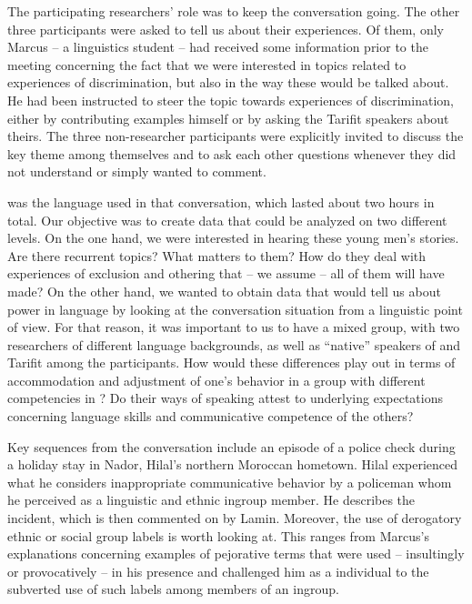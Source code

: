 \documentclass[output=paper,colorlinks,citecolor=brown]{langscibook}
\begin{document}
The participating researchers' role was to keep the conversation going. The other three participants were asked to tell us about their experiences. Of them, only Marcus -- a linguistics student -- had received some information prior to the meeting concerning the fact that we were interested in topics related to experiences of discrimination, but also in the way these would be talked about. He had been instructed to steer the topic towards experiences of discrimination, either by contributing examples himself or by asking the Tarifit speakers about theirs. The three non-researcher participants were explicitly invited to discuss the key theme among themselves and to ask each other questions whenever they did not understand or simply wanted to comment.

 was the language used in that conversation, which lasted about two hours in total. Our objective was to create data that could be analyzed on two different levels. On the one hand, we were interested in hearing these young men's stories. Are there recurrent topics? What matters to them? How do they deal with experiences of exclusion and othering that -- we assume -- all of them will have made? On the other hand, we wanted to obtain data that would tell us about power in language by looking at the conversation situation from a linguistic point of view. For that reason, it was important to us to have a mixed group, with two researchers of different language backgrounds, as well as ``native'' speakers of  and Tarifit among the participants. How would these differences play out in terms of accommodation and adjustment of one's behavior in a group with different competencies in ? Do their ways of speaking attest to underlying expectations concerning language skills and communicative competence of the others? 

Key sequences from the conversation include an episode of a police check during a holiday stay in Nador, Hilal's northern Moroccan hometown. Hilal experienced what he considers inappropriate communicative behavior by a policeman whom he perceived as a linguistic and ethnic ingroup member. He describes the incident, which is then commented on by Lamin. Moreover, the use of derogatory ethnic or social group labels is worth looking at. This ranges from Marcus's explanations concerning examples of pejorative terms that were used -- insultingly or provocatively -- in his presence and challenged him as a  individual to the subverted use of such labels among members of an ingroup. 
\end{document}
